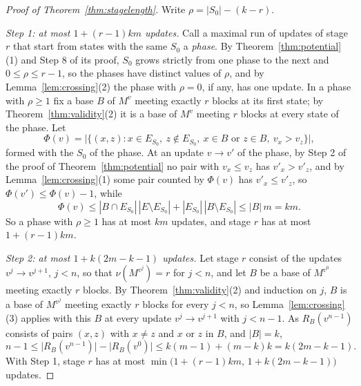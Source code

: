 \begin{proof}[Proof of Theorem~\ref{thm:stagelength}]
Write $\rho=|S_0|-(k-r)$.

\emph{Step 1: at most $1+(r-1)km$ updates.}  Call a maximal run of updates of stage $r$
that start
from states with the same $S_0$ a \emph{phase}.  By Theorem~\ref{thm:potential}(1)
and Step 8 of its proof, $S_0$ grows strictly from one phase to the next and
$0\le\rho\le r-1$, so the phases have distinct values of $\rho$, and by Lemma~\ref{lem:crossing}(2) the
phase with $\rho=0$, if any, has one update.  In a phase with $\rho\ge1$ fix a
base $B$ of $M^{v}$ meeting exactly $r$ blocks at its first state; by Theorem~\ref{thm:validity}(2) it is a base of $M^{v}$
meeting $r$ blocks at every state of the phase.  Let
\[
  \Phi(v)=\bigl|\{(x,z):x\in E_{S_0},\ z\notin E_{S_0},\ x\in B\text{ or }z\in B,\
  v_x>v_z\}\bigr|,
\]
formed with the $S_0$ of the phase.  At an update $v\to v'$ of the phase, by Step 2
of the proof of Theorem~\ref{thm:potential} no pair with $v_x\le v_z$ has
$v'_x>v'_z$, and by Lemma~\ref{lem:crossing}(1) some pair counted by $\Phi(v)$ has $v'_x\le v'_z$, so
$\Phi(v')\le\Phi(v)-1$, while
\[
  \Phi(v)\le|B\cap E_{S_0}|\,|E\setminus E_{S_0}|+|E_{S_0}|\,|B\setminus E_{S_0}|\le|B|\,m=km.
\]
So a phase with $\rho\ge1$ has at most $km$ updates, and stage $r$ has at most
$1+(r-1)km$.

\emph{Step 2: at most $1+k(2m-k-1)$ updates.}  Let stage $r$ consist of the updates
$v^{j}\to v^{j+1}$, $j<n$, so that $\nu(M^{v^{j}})=r$ for $j<n$, and let $B$ be a base
of $M^{v^{0}}$ meeting exactly $r$ blocks.  By Theorem~\ref{thm:validity}(2) and
induction on $j$, $B$ is a base of $M^{v^{j}}$ meeting exactly $r$ blocks for every
$j<n$, so Lemma~\ref{lem:crossing}(3) applies with this $B$ at every update $v^{j}\to v^{j+1}$ with
$j<n-1$.  As $R_B(v^{n-1})$ consists of pairs $(x,z)$ with $x\ne z$ and $x$ or $z$
in $B$, and $|B|=k$,
\[
  n-1\le\bigl|R_B(v^{n-1})\bigr|-\bigl|R_B(v^{0})\bigr|\le k(m-1)+(m-k)k=k(2m-k-1).
\]
With Step 1, stage $r$ has at most $\min\bigl(1+(r-1)km,\,1+k(2m-k-1)\bigr)$ updates.
\end{proof}


